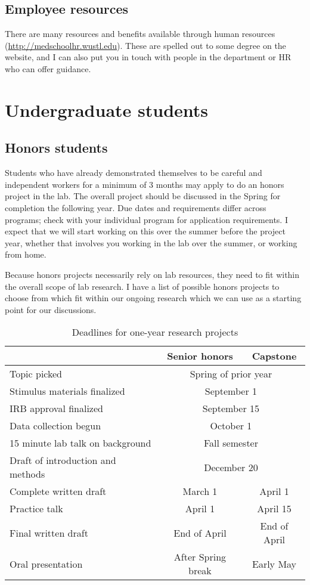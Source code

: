 \documentclass[letterpaper,12pt,oneside]{memoir}
\begin{document}
\subsection{Employee resources}

There are many resources and benefits available through human resources (\url{http://medschoolhr.wustl.edu}). These are spelled out to some degree on the website, and I can also put you in touch with people in the department or HR who can offer guidance.


\section{Undergraduate students}

\subsection{Honors students}

Students who have already demonstrated themselves to be careful and independent workers for a minimum of 3 months may apply to do an honors project in the lab. The overall project should be discussed in the Spring for completion the following year. Due dates and requirements differ across programs; check with your individual program for application requirements. I expect that we will start working on this over the summer before the project year, whether that involves you working in the lab over the summer, or working from home.

Because honors projects necessarily rely on lab resources, they need to fit within the overall scope of lab research. I have a list of possible honors projects to choose from which fit within our ongoing research which we can use as a starting point for our discussions.



\begin{table}
\centering
\caption{Deadlines for one-year research projects}
\begin{tabular}{lcc}
\toprule
& Senior honors & Capstone\\
\midrule
Topic picked& \multicolumn{2}{c}{Spring of prior year}\\
Stimulus materials finalized& \multicolumn{2}{c}{September 1}\\
IRB approval finalized& \multicolumn{2}{c}{September 15}\\
Data collection begun& \multicolumn{2}{c}{October 1}\\
15 minute lab talk on background& \multicolumn{2}{c}{Fall semester}\\
Draft of introduction and methods& \multicolumn{2}{c}{December 20}\\
Complete written draft& March 1& April 1\\
Practice talk& April 1 & April 15\\
Final written draft& End of April & End of April\\
Oral presentation& After Spring break & Early May\\
\bottomrule
\end{tabular}
\end{table}
\end{document}
